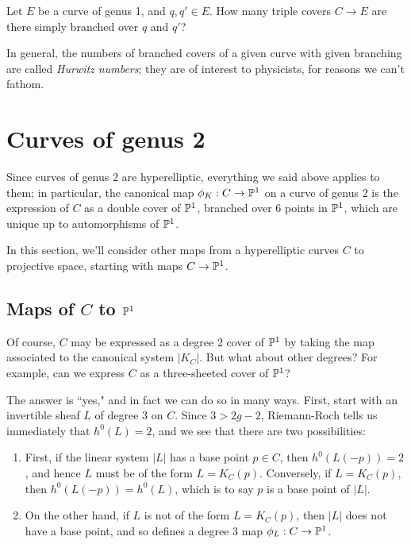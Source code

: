 \begin{exercise} Let $E$ be a curve of genus 1, and $q, q' \in E$. How many triple covers $C \to E$ are there simply branched over $q$ and $q'$?
\end{exercise}


In general, the numbers of branched covers of a given curve with given branching are called \emph{Hurwitz numbers}; they are of interest to physicists, for reasons we can't fathom.



\section{Curves of genus 2}

Since  curves of genus 2 are hyperelliptic, everything we said above applies to them; in particular, the canonical map $\phi_K : C \to \PP^1$ on a curve of genus 2 is the expression of $C$ as a double cover of $\PP^1$, branched over 6 points in $\PP^1$, which are unique up to automorphisms of $\PP^1$. 

In this section, we'll consider other maps from a hyperelliptic curves $C$ to projective space, starting with maps $C \to \PP^1$.

\subsection{Maps of $C$ to $\PP^1$}\label{genus 2 pencil}

Of course, $C$ may be expressed as a degree 2 cover of $\PP^1$ by taking the map associated to the canonical system $|K_C|$. But what about other degrees? For example, can we express $C$ as a three-sheeted cover of $\PP^1$?

The answer is ``yes," and in fact we can do so in many ways. First, start with an invertible sheaf $L$ of degree 3 on $C$. Since $3 > 2g-2$, Riemann-Roch tells us immediately that $h^0(L) = 2$, and we see that there are two possibilities:

\begin{enumerate}
\item First, if the linear system $|L|$ has a base point $p \in C$, then $h^0(L(-p)) = 2$, and hence $L$ must be of the form $L = K_C(p)$. Conversely, if $L = K_C(p)$, then $h^0(L(-p)) = h^0(L)$, which is to say $p$ is a base point of $|L|$.
\item On the other hand, if $L$ is not of the form $L = K_C(p)$, then $|L|$ does not have a base point, and so defines a degree 3 map $\phi_L : C \to \PP^1$.
\end{enumerate}

